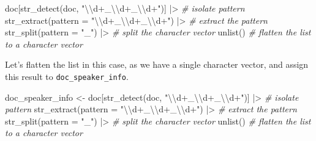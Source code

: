 \documentclass[
  letterpaper,
  DIV=11,
  numbers=noendperiod]{scrreport}
\newenvironment{Shaded}{\begin{snugshade}}{\end{snugshade}}
\newcommand{\AttributeTok}[1]{\textcolor[rgb]{0.00,0.00,0.00}{#1}}
\newcommand{\CommentTok}[1]{\textcolor[rgb]{0.00,0.00,0.00}{\textit{#1}}}
\newcommand{\FunctionTok}[1]{\textcolor[rgb]{0.00,0.00,0.00}{#1}}
\newcommand{\NormalTok}[1]{\textcolor[rgb]{0.00,0.00,0.00}{#1}}
\newcommand{\OtherTok}[1]{\textcolor[rgb]{0.00,0.00,0.00}{#1}}
\newcommand{\SpecialCharTok}[1]{\textcolor[rgb]{0.00,0.00,0.00}{#1}}
\newcommand{\StringTok}[1]{\textcolor[rgb]{0.00,0.00,0.00}{#1}}
\theoremstyle{definition}
\theoremstyle{remark}
\begin{document}
\begin{Shaded}
\begin{Highlighting}[]
\NormalTok{doc[}\FunctionTok{str\_detect}\NormalTok{(doc, }\StringTok{"}\SpecialCharTok{\textbackslash{}\textbackslash{}}\StringTok{d+\_}\SpecialCharTok{\textbackslash{}\textbackslash{}}\StringTok{d+\_}\SpecialCharTok{\textbackslash{}\textbackslash{}}\StringTok{d+"}\NormalTok{)] }\SpecialCharTok{|\textgreater{}} \CommentTok{\# isolate pattern}
  \FunctionTok{str\_extract}\NormalTok{(}\AttributeTok{pattern =} \StringTok{"}\SpecialCharTok{\textbackslash{}\textbackslash{}}\StringTok{d+\_}\SpecialCharTok{\textbackslash{}\textbackslash{}}\StringTok{d+\_}\SpecialCharTok{\textbackslash{}\textbackslash{}}\StringTok{d+"}\NormalTok{) }\SpecialCharTok{|\textgreater{}} \CommentTok{\# extract the pattern}
  \FunctionTok{str\_split}\NormalTok{(}\AttributeTok{pattern =} \StringTok{"\_"}\NormalTok{) }\SpecialCharTok{|\textgreater{}} \CommentTok{\# split the character vector}
  \FunctionTok{unlist}\NormalTok{() }\CommentTok{\# flatten the list to a character vector}
\end{Highlighting}
\end{Shaded}

Let's flatten the list in this case, as we have a single character
vector, and assign this result to \texttt{doc\_speaker\_info}.

\begin{Shaded}
\begin{Highlighting}[]
\NormalTok{doc\_speaker\_info }\OtherTok{\textless{}{-}}
\NormalTok{  doc[}\FunctionTok{str\_detect}\NormalTok{(doc, }\StringTok{"}\SpecialCharTok{\textbackslash{}\textbackslash{}}\StringTok{d+\_}\SpecialCharTok{\textbackslash{}\textbackslash{}}\StringTok{d+\_}\SpecialCharTok{\textbackslash{}\textbackslash{}}\StringTok{d+"}\NormalTok{)] }\SpecialCharTok{|\textgreater{}} \CommentTok{\# isolate pattern}
  \FunctionTok{str\_extract}\NormalTok{(}\AttributeTok{pattern =} \StringTok{"}\SpecialCharTok{\textbackslash{}\textbackslash{}}\StringTok{d+\_}\SpecialCharTok{\textbackslash{}\textbackslash{}}\StringTok{d+\_}\SpecialCharTok{\textbackslash{}\textbackslash{}}\StringTok{d+"}\NormalTok{) }\SpecialCharTok{|\textgreater{}} \CommentTok{\# extract the pattern}
  \FunctionTok{str\_split}\NormalTok{(}\AttributeTok{pattern =} \StringTok{"\_"}\NormalTok{) }\SpecialCharTok{|\textgreater{}} \CommentTok{\# split the character vector}
  \FunctionTok{unlist}\NormalTok{() }\CommentTok{\# flatten the list to a character vector}
\end{Highlighting}
\end{Shaded}
\end{document}
